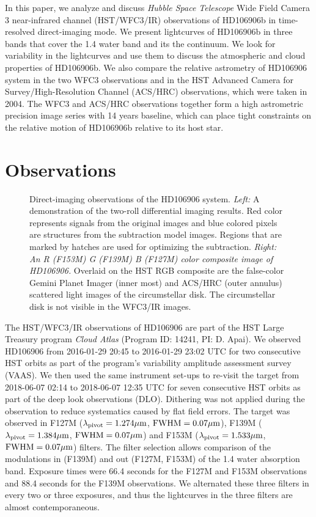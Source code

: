 \documentclass[twocolumn, trackchanges]{aastex62}
\begin{document}
In this paper, we analyze and discuss \emph{Hubble Space Telescope} Wide Field Camera 3 near-infrared channel (HST/WFC3/IR) observations of HD106906b in time-resolved direct-imaging mode. We present lightcurves of HD106906b in three bands that cover the 1.4\micron{} water band and its the continuum. We look for variability in the lightcurves and use them to discuss the atmospheric and cloud properties of HD106906b. We also compare the relative astrometry of HD106906 system in the two WFC3 observations and in the HST Advanced Camera for Survey/High-Resolution Channel (ACS/HRC) observations, which were taken in 2004. The WFC3 and ACS/HRC observations together form a high astrometric precision  image series with 14 years baseline,  which can place tight constraints on the relative motion of HD106906b relative to its host star.

\section{Observations}

\begin{figure}
  \centering
{}  
  \caption{Direct-imaging observations of the HD106906 system. \emph{Left:} A demonstration of the two-roll differential imaging results. Red color represents signals from the original images and blue colored pixels are structures from the subtraction model images. Regions that are marked by hatches are used for optimizing the subtraction. \emph{Right: An R (F153M) G (F139M) B (F127M) color composite image of HD106906.} Overlaid on the HST RGB composite are the false-color Gemini Planet Imager (inner most) and ACS/HRC (outer annulus) scattered light images \citep{Kalas2015} of the circumstellar disk. The circumstellar disk is not visible in the WFC3/IR images.}
  \label{fig:2rdi}
\end{figure}


The HST/WFC3/IR observations of HD106906 are part of the HST Large Treasury program \emph{Cloud Atlas} (Program ID: 14241, PI: D. Apai). We observed HD106906 from 2016-01-29 20:45 to 2016-01-29 23:02 UTC for two consecutive HST orbits as part of the program's variability amplitude assessment survey (VAAS). We then used the same instrument set-ups to re-visit the target from 2018-06-07 02:14 to 2018-06-07 12:35 UTC  for seven consecutive HST orbits as part of the deep look observations (DLO). Dithering was not applied during the observation to reduce systematics caused by flat field errors. The target was observed in F127M ($\lambda_{\mathrm{pivot}}=1.274\mbox{$\mu$m}$, $\mathrm{FWHM}=0.07\mbox{$\mu$m}$), F139M ($\lambda_{\mathrm{pivot}}=1.384\mbox{$\mu$m}$, $\mathrm{FWHM}=0.07\mbox{$\mu$m}$) and F153M ($\lambda_{\mathrm{pivot}}=1.533\mbox{$\mu$m}$, $\mathrm{FWHM}=0.07\mbox{$\mu$m}$) filters.  The filter selection allows comparison of the modulations  in (F139M) and out  (F127M, F153M) of the 1.4 \micron{} water absorption band.  Exposure times were 66.4 seconds for the F127M and F153M observations and 88.4 seconds for the F139M observations. We alternated these three filters in every two or three exposures, and thus the lightcurves in the three filters are almost contemporaneous. 
\end{document}
